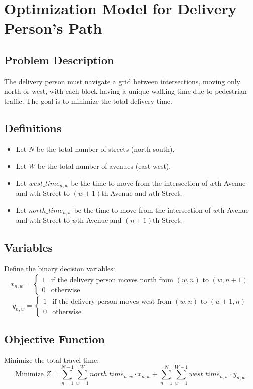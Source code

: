 \documentclass{article}
\begin{document}
\section*{Optimization Model for Delivery Person's Path}

\subsection*{Problem Description}
The delivery person must navigate a grid between intersections, moving only north or west, with each block having a unique walking time due to pedestrian traffic. The goal is to minimize the total delivery time.

\subsection*{Definitions}
\begin{itemize}
    \item Let \( N \) be the total number of streets (north-south).
    \item Let \( W \) be the total number of avenues (east-west).
    \item Let \( west\_time_{n,w} \) be the time to move from the intersection of \( w \)th Avenue and \( n \)th Street to \( (w+1) \)th Avenue and \( n \)th Street.
    \item Let \( north\_time_{n,w} \) be the time to move from the intersection of \( w \)th Avenue and \( n \)th Street to \( w \)th Avenue and \( (n+1) \)th Street.
\end{itemize}

\subsection*{Variables}
Define the binary decision variables:
\[
x_{n,w} =
\begin{cases}
1 & \text{if the delivery person moves north from } (w, n) \text{ to } (w, n+1) \\
0 & \text{otherwise}
\end{cases}
\]
\[
y_{n,w} =
\begin{cases}
1 & \text{if the delivery person moves west from } (w, n) \text{ to } (w+1, n) \\
0 & \text{otherwise}
\end{cases}
\]

\subsection*{Objective Function}
Minimize the total travel time:
\[
\text{Minimize } Z = \sum_{n=1}^{N-1} \sum_{w=1}^{W} north\_time_{n,w} \cdot x_{n,w} + \sum_{n=1}^{N} \sum_{w=1}^{W-1} west\_time_{n,w} \cdot y_{n,w}
\]
\end{document}
